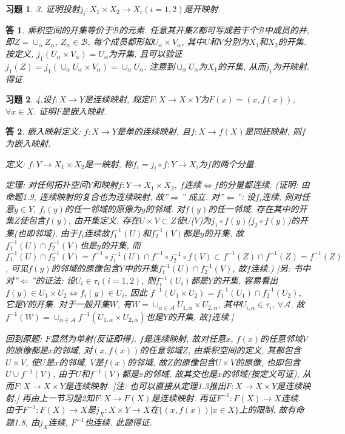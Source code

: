 \documentclass{ctexart}%
\newtheorem*{exercise}{习题}
\newtheorem*{solution}{答}
\theoremstyle{definition}
\theoremstyle{remark}
\begin{document}
\begin{exercise}3. 证明投射$j_i: X_1\times X_2\rightarrow X_i (i=1,2)$是开映射.
\end{exercise}
\begin{solution}
乘积空间的开集等价于$\overline{\mathscr{B}}$的元素. 任意其开集$Z$都可写成若干个$\mathscr{B}$中成员的并, 即$Z=\cup_\alpha Z_\alpha$, $Z_\alpha\in \mathscr{B}$, 每个成员都形如$U_\alpha\times V_\alpha$, 其中$U$和$V$分别为$X_1$和$X_2$的开集. 按定义, $j_1(U_\alpha \times V_\alpha)=U_\alpha$为开集, 且可以验证 
$j_1(Z)=j_1(\cup_\alpha U_\alpha \times V_\alpha)=\cup_\alpha U_\alpha$. 注意到$\cup_\alpha U_\alpha$为$X_1$的开集, 从而$j_1$为开映射. 得证. 
\end{solution}

\begin{exercise}4.设$f:X\rightarrow Y$是连续映射, 规定$F:X\rightarrow X\times Y$为$F(x)=(x,f(x))$, $\forall x\in X$. 证明$F$是嵌入映射.
\end{exercise}
\begin{solution}嵌入映射定义: $f:X\rightarrow Y$是单的连续映射, 且$f:X\rightarrow f(X)$是同胚映射, 则$f$为嵌入映射.

定义: $f:Y\rightarrow X_1\times X_2$是一映射, 称$f_i=j_i\circ f:Y\rightarrow X_i$为$f$的两个分量. 

定理: 对任何拓扑空间$Y$和映射$f: Y\rightarrow X_1\times X_2$, $f$连续$\Longleftrightarrow f$的分量都连续. (证明: 由命题1.9, 连续映射的复合也为连续映射, 故''$\Longrightarrow$'' 成立. 对''$\Longleftarrow$'': 
设$f_i$连续, 则对任意$y\in Y$, $f_i(y)$的任一邻域的原像为$y$的邻域. 对$f(y)$的任一邻域, 存在其中的开集$Z$使包含$f(y)$, 由开集定义, 存在$U\times V\subset Z$使$U$($V$)为$j_1\circ f(y)$($j_2\circ f(y)$)的开集(也即邻域),  由于$f_i$连续故$f^{-1}_1(U)$和$f^{-1}_2(V)$都是$y$的开集, 故$f^{-1}_1(U)\cap f^{-1}_2(V)$也是$y$的开集, 而$f^{-1}_1(U)\cap f^{-1}_2(V)= f^{-1}\circ j_1^{-1} (U) \cap f^{-1}\circ j_2^{-1}\circ f(V)\subset f^{-1} (Z)\cap f^{-1}(Z)=f^{-1}(Z)$, 可见$f(y)$的邻域的原像包含$Y$中的开集$f^{-1}_1(U)\cap f^{-1}_2(V)$, 故$f$连续.) [另: 书中对''$\Longleftarrow$''的证法: 设$U_i\in \tau_i(i=1,2)$, 则$f^{-1}_i(U_i)$都是$Y$的开集, 容易看出$f(y)\in U_1\times U_2\Longleftrightarrow f_i(y)\in U_i$, 因此 $f^{-1}(U_1\times U_2)=f^{-1}_1(U_1)\cap f^{-1}_2(U_2)$, 它是$Y$的开集. 对于一般开集$W$, 有$W= \cup_{\alpha\in \mathscr{A}} U_{1,\alpha}\times U_{2,\alpha}$, 其中$U_{i,\alpha}\in \tau_i$, $\forall \mathscr{A}$. 故 $f^{-1}(W)=\cup_{\alpha\in \mathscr{A}} f^{-1}(U_{1,\alpha}\times U_{2,\alpha})$也是$Y$的开集, 故$f$连续.]


回到原题: $F$显然为单射(反证即得). $f$是连续映射, 故对任意$x$, $f(x)$的任意邻域$V$的原像都是$x$的邻域, 对$(x,f(x))$的任意邻域$Z$, 由乘积空间的定义, 其都包含$U\times V$, 使$U$是$x$的邻域, $V$是$f(x)$的邻域, 故$Z$的原像包含$U\times V$的原像, 也即包含$U\cup f^{-1}(V)$, 由于$U$和$f^{-1}(V)$都是$x$的邻域, 故其交也是$x$的邻域(按定义可证), 从而$F: X\rightarrow X\times Y$是连续映射. [注: 也可以直接从定理1.3推出$F: X\rightarrow X\times Y$是连续映射.] 再由上一节习题2知$F:X\rightarrow F(X)$是连续映射. 再证$F^{-1}: F(X)\rightarrow X$连续. 
由于$F^{-1}: F(X)\rightarrow X$是$j_X:X\times Y\rightarrow X$在$\{(x,f(x))|x\in X\}$上的限制, 故有命题1.8, 由$j_X$连续, $F^{-1}$也连续. 此题得证.
\end{solution}
\end{document}
